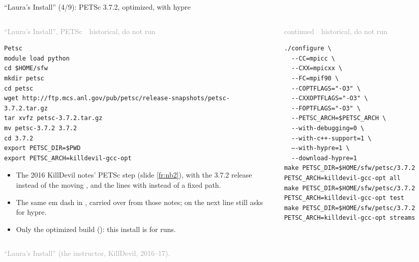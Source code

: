 \documentclass[aspectratio=169,11pt]{beamer}
\newcommand{\sourcecredit}[1]{\vfill\begin{flushright}\tiny\textcolor{DarkGray}{#1}\end{flushright}}
\newcommand{\emdashmark}{\textcolor{RubineRed}{\rmfamily\textemdash}}
\newcommand{\hist}[1]{{\tiny\sffamily\textcolor{DarkGray}{#1\ \textbullet\ historical, do not run}}\par\nointerlineskip\vspace{0.3mm}}
\begin{document}
\begin{frame}[fragile]{``Laura's Install'' (4/9): PETSc 3.7.2, optimized, with hypre}
\label{fr:li3}
\begin{columns}[T,onlytextwidth]
\begin{column}{0.44\textwidth}
\hist{``Laura's Install'', PETSc}
\begin{lstlisting}[style=hist]
Petsc
module load python
cd $HOME/sfw
mkdir petsc
cd petsc
wget http://ftp.mcs.anl.gov/pub/petsc/release-snapshots/petsc-3.7.2.tar.gz
tar xvfz petsc-3.7.2.tar.gz
mv petsc-3.7.2 3.7.2
cd 3.7.2
export PETSC_DIR=$PWD
export PETSC_ARCH=killdevil-gcc-opt
\end{lstlisting}
\scriptsize
\begin{itemize}\setlength{\itemsep}{0pt}
  \item The 2016 KillDevil notes' PETSc step (slide \ref{fr:nb2}), with the 3.7.2 release instead of the moving , and the  lines with  instead of a fixed path.
  \item The same em dash in \code{\emdashmark{}-with-hypre=1}, carried over from those notes;  on the next line still asks for hypre.
  \item Only the optimized build (): this install is for runs.
\end{itemize}
\end{column}
\begin{column}{0.53\textwidth}
\hist{continued}
\begin{lstlisting}[style=hist]
./configure \
  --CC=mpicc \
  --CXX=mpicxx \
  --FC=mpif90 \
  --COPTFLAGS="-O3" \
  --CXXOPTFLAGS="-O3" \
  --FOPTFLAGS="-O3" \
  --PETSC_ARCH=$PETSC_ARCH \
  --with-debugging=0 \
  --with-c++-support=1 \
  —-with-hypre=1 \
  --download-hypre=1
make PETSC_DIR=$HOME/sfw/petsc/3.7.2 PETSC_ARCH=killdevil-gcc-opt all
make PETSC_DIR=$HOME/sfw/petsc/3.7.2 PETSC_ARCH=killdevil-gcc-opt test
make PETSC_DIR=$HOME/sfw/petsc/3.7.2 PETSC_ARCH=killdevil-gcc-opt streams
\end{lstlisting}
\end{column}
\end{columns}
\sourcecredit{``Laura's Install'' (the instructor, KillDevil, 2016--17).}
\end{frame}
\end{document}
